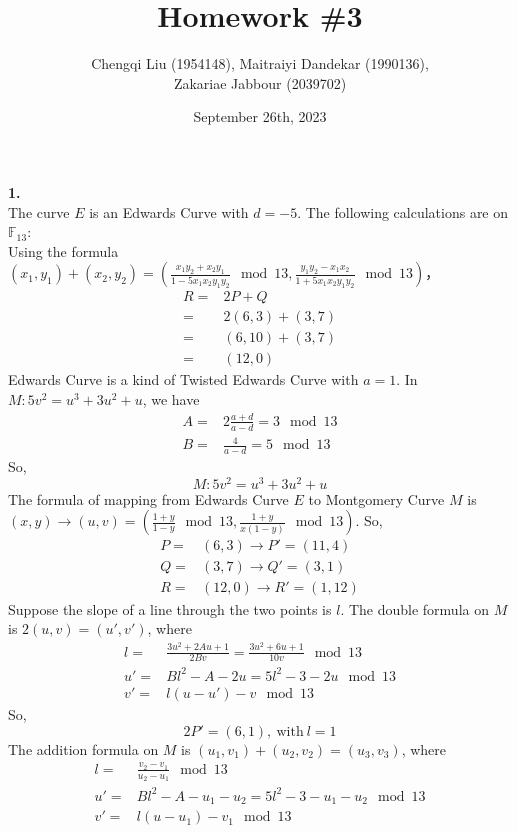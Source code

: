 \documentclass[
12pt, %
]{fphw}
\title{Homework \#3} %
\author{Chengqi Liu (1954148), Maitraiyi Dandekar (1990136),\\ Zakariae Jabbour (2039702)} %
\date{September 26th, 2023} %
\institute{Eindhoven University of Technology} %
\begin{document}
\maketitle %

\textbf{1.\\}
The curve $E$ is an Edwards Curve with $d=-5$. The following calculations are on $\mathbb{F}_{13}$:\\
Using the formula $(x_1,y_1)+(x_2,y_2)=(\frac{x_1y_2+x_2y_1}{1-5x_1x_2y_1y_2} \mod 13,\frac{y_1y_2-x_1x_2}{1+5x_1x_2y_1y_2}\mod 13)$，
\begin{align*}
	R=&2P+Q\\
	=&2(6,3)+(3,7)\\
	=&(6,10)+(3,7)\\
	=&(12,0)
\end{align*}
Edwards Curve is a kind of Twisted Edwards Curve with $a=1$. In $M:5v^2=u^3+3u^2+u$, we have
\begin{align*}
	A=&2\frac{a+d}{a-d}=3 \mod 13\\
	B=&\frac{4}{a-d}=5\mod 13
\end{align*}
So,
\[M:5v^2=u^3+3u^2+u\]
The formula of mapping from Edwards Curve $E$ to Montgomery Curve $M$ is $(x,y)\rightarrow (u,v)=(\frac{1+y}{1-y} \mod 13,\frac{1+y}{x(1-y)} \mod 13)$. So,
\begin{align*}
	P=&(6,3)\rightarrow P'=(11,4)\\
	Q=&(3,7)\rightarrow Q'=(3,1)\\
	R=&(12,0)\rightarrow R'=(1,12)
\end{align*}
Suppose the slope of a line through the two points is $l$. The double formula on $M$ is $2(u,v)=(u',v')$, where
\begin{align*}
	l=&\frac{3u^2+2Au+1}{2Bv}=\frac{3u^2+6u+1}{10v} \mod 13\\
	u'=&Bl^2-A-2u=5l^2-3-2u \mod 13\\
	v'=&l(u-u')-v \mod 13
\end{align*}
So, \[2P'=(6,1),\  \text{with}\ l=1\]
The addition formula on $M$ is $(u_1,v_1)+(u_2,v_2)=(u_3,v_3)$, where
\begin{align*}
	l=&\frac{v_2-v_1}{u_2-u_1} \mod 13\\
	u'=&Bl^2-A-u_1-u_2=5l^2-3-u_1-u_2 \mod 13\\
	v'=&l(u-u_1)-v_1 \mod 13
\end{align*}
\end{document}
